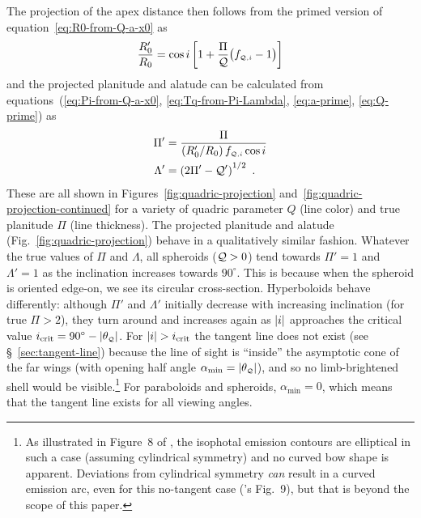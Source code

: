 The projection of the apex distance then follows from the primed
version of equation~\eqref{eq:R0-from-Q-a-x0} as
\begin{equation}
  \label{eq:R0-prime}
  \frac{R_0'}{R_0} =
  \cos i \left[ 1 + \frac{\Pi} {\mathcal{Q}} \bigl(f_{\scriptscriptstyle \mathcal{Q},i} - 1\bigr) \right]
\end{equation}
and the projected planitude and alatude can be calculated from
equations~(\ref{eq:Pi-from-Q-a-x0}, \ref{eq:Tq-from-Pi-Lambda},
\ref{eq:a-prime}, \ref{eq:Q-prime}) as
\begin{align}
  \label{eq:Pi-prime}
  \Pi' &= \frac{\Pi}{(R_0'/R_0)\, f_{\scriptscriptstyle \mathcal{Q},i} \cos i } \\
  \label{eq:Lambda-prime}
  \Lambda' &= \left( 2 \Pi' - \mathcal{Q}' \right)^{1/2} \ .
\end{align}
These are all shown in Figures~\ref{fig:quadric-projection}
and~\ref{fig:quadric-projection-continued} for a variety of quadric
parameter \(Q\) (line color) and true planitude \(\Pi\) (line
thickness).  The projected planitude and alatude
(Fig.~\ref{fig:quadric-projection}) behave in a qualitatively similar
fashion.  Whatever the true values of \(\Pi\) and \(\Lambda\), all spheroids
(\(\mathcal{Q} > 0\)) tend towards \(\Pi' = 1\) and \(\Lambda' = 1\) as the inclination
increases towards \(90^\circ\).  This is because when the spheroid is
oriented edge-on, we see its circular cross-section.  Hyperboloids
behave differently: although \(\Pi'\) and \(\Lambda'\) initially decrease with
increasing inclination (for true \(\Pi > 2\)), they turn around and
increases again as \(\lvert i\rvert\) approaches the critical value
\(i_{\mathrm{crit}} = 90^\circ - \lvert\theta_{\scriptscriptstyle \mathcal{Q}}\rvert\).  For
\(\lvert i\rvert > i_{\mathrm{crit}}\) the tangent line does not exist (see
\S~\ref{sec:tangent-line}) because the line of sight is ``inside'' the
asymptotic cone of the far wings (with opening half angle
\(\alpha_{\mathrm{min}} = \lvert\theta_{\scriptscriptstyle \mathcal{Q}}\rvert\)), and so no limb-brightened shell
would be visible.\footnote{%
  As illustrated in Figure~8 of \citet{Graham:2002a}, the isophotal
  emission contours are elliptical in such a case (assuming
  cylindrical symmetry) and no curved bow shape is apparent.
  Deviations from cylindrical symmetry \emph{can} result in a curved
  emission arc, even for this no-tangent case
  (\citeauthor{Graham:2002a}'s Fig.~9), but that is beyond the scope
  of this paper.} For paraboloids and spheroids,
\(\alpha_{\mathrm{min}} = 0\), which means that the tangent line exists for
all viewing angles.

